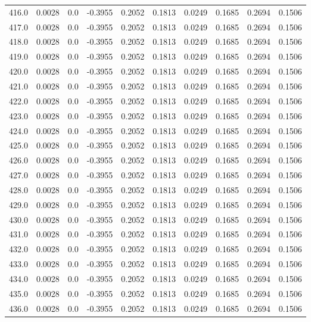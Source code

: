 \begin{longtable}{lrrrrrrrrr}
416.0 & 0.0028 & 0.0 & -0.3955 & 0.2052 & 0.1813 & 0.0249 & 0.1685 & 0.2694 & 0.1506 \\
417.0 & 0.0028 & 0.0 & -0.3955 & 0.2052 & 0.1813 & 0.0249 & 0.1685 & 0.2694 & 0.1506 \\
418.0 & 0.0028 & 0.0 & -0.3955 & 0.2052 & 0.1813 & 0.0249 & 0.1685 & 0.2694 & 0.1506 \\
419.0 & 0.0028 & 0.0 & -0.3955 & 0.2052 & 0.1813 & 0.0249 & 0.1685 & 0.2694 & 0.1506 \\
420.0 & 0.0028 & 0.0 & -0.3955 & 0.2052 & 0.1813 & 0.0249 & 0.1685 & 0.2694 & 0.1506 \\
421.0 & 0.0028 & 0.0 & -0.3955 & 0.2052 & 0.1813 & 0.0249 & 0.1685 & 0.2694 & 0.1506 \\
422.0 & 0.0028 & 0.0 & -0.3955 & 0.2052 & 0.1813 & 0.0249 & 0.1685 & 0.2694 & 0.1506 \\
423.0 & 0.0028 & 0.0 & -0.3955 & 0.2052 & 0.1813 & 0.0249 & 0.1685 & 0.2694 & 0.1506 \\
424.0 & 0.0028 & 0.0 & -0.3955 & 0.2052 & 0.1813 & 0.0249 & 0.1685 & 0.2694 & 0.1506 \\
425.0 & 0.0028 & 0.0 & -0.3955 & 0.2052 & 0.1813 & 0.0249 & 0.1685 & 0.2694 & 0.1506 \\
426.0 & 0.0028 & 0.0 & -0.3955 & 0.2052 & 0.1813 & 0.0249 & 0.1685 & 0.2694 & 0.1506 \\
427.0 & 0.0028 & 0.0 & -0.3955 & 0.2052 & 0.1813 & 0.0249 & 0.1685 & 0.2694 & 0.1506 \\
428.0 & 0.0028 & 0.0 & -0.3955 & 0.2052 & 0.1813 & 0.0249 & 0.1685 & 0.2694 & 0.1506 \\
429.0 & 0.0028 & 0.0 & -0.3955 & 0.2052 & 0.1813 & 0.0249 & 0.1685 & 0.2694 & 0.1506 \\
430.0 & 0.0028 & 0.0 & -0.3955 & 0.2052 & 0.1813 & 0.0249 & 0.1685 & 0.2694 & 0.1506 \\
431.0 & 0.0028 & 0.0 & -0.3955 & 0.2052 & 0.1813 & 0.0249 & 0.1685 & 0.2694 & 0.1506 \\
432.0 & 0.0028 & 0.0 & -0.3955 & 0.2052 & 0.1813 & 0.0249 & 0.1685 & 0.2694 & 0.1506 \\
433.0 & 0.0028 & 0.0 & -0.3955 & 0.2052 & 0.1813 & 0.0249 & 0.1685 & 0.2694 & 0.1506 \\
434.0 & 0.0028 & 0.0 & -0.3955 & 0.2052 & 0.1813 & 0.0249 & 0.1685 & 0.2694 & 0.1506 \\
435.0 & 0.0028 & 0.0 & -0.3955 & 0.2052 & 0.1813 & 0.0249 & 0.1685 & 0.2694 & 0.1506 \\
436.0 & 0.0028 & 0.0 & -0.3955 & 0.2052 & 0.1813 & 0.0249 & 0.1685 & 0.2694 & 0.1506 \\

\end{longtable}
